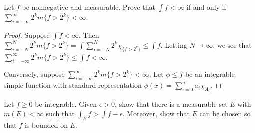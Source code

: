 \documentclass{article}
\begin{document}
 Let $f$ be nonnegative and measurable. Prove that $\int f < \infty$ if and only if $\sum_{i=-\infty}^\infty 2^k m\{ f > 2^k \} < \infty$.
\begin{proof}
Suppose $\int f < \infty$. Then $\sum_{i=-N}^N 2^k m\{ f > 2^k \} = \int \sum_{i=-N}^N 2^k \chi_{\{ f > 2^k \}} \le \int f$.  Letting $N \to \infty$, we see that $\sum_{i=-\infty}^\infty 2^k m\{ f > 2^k \} \le \int f < \infty$.

Conversely, suppose $\sum_{i=-\infty}^\infty 2^k m\{ f > 2^k \} < \infty$. Let $\phi \le f$ be an integrable simple function with standard representation 
$\phi(x) = \sum_{i=0}^n a_i \chi_{A_i}$.  %
\end{proof}


 Let $f \ge 0$ be integrable. Given $\epsilon >0$, show that there is a measurable set $E$ with $m(E) < \infty$ such that $\int_E f > \int f - \epsilon$. Moreover, show that $E$ can be chosen so that $f$ is bounded on $E$.
\end{document}
